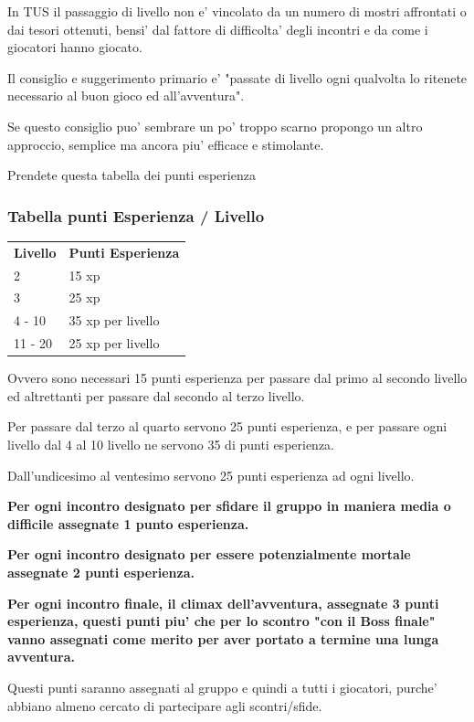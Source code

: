 \documentclass[a4paper,11pt,twoside,openany]{book}
\begin{document}
{In TUS il passaggio di livello non e' vincolato da un numero di mostri affrontati o dai tesori ottenuti, bensi' dal fattore di difficolta' degli incontri e da come i giocatori hanno giocato.

Il consiglio e suggerimento primario e' "passate di livello ogni qualvolta lo ritenete necessario al buon gioco ed all'avventura".

Se questo consiglio puo' sembrare un po' troppo scarno propongo un altro approccio, semplice ma ancora piu' efficace e stimolante.

Prendete questa tabella dei punti esperienza

\subsubsection{Tabella punti Esperienza / Livello}

\label{tabella-punti-esperienza-livello}

\begin{tabular}{ll}
\toprule
\textbf{Livello} & \textbf{Punti Esperienza}\tabularnewline
2 & 15 xp\tabularnewline
3 & 25 xp\tabularnewline
4 - 10 & 35 xp per livello\tabularnewline
11 - 20 & 25 xp per livello\tabularnewline
\end{tabular}

\bigskip

Ovvero sono necessari 15 punti esperienza per passare dal primo al secondo livello ed altrettanti per passare dal secondo al terzo livello.

Per passare dal terzo al quarto servono 25 punti esperienza, e per passare ogni livello dal 4 al 10 livello ne servono 35 di punti esperienza.

Dall'undicesimo al ventesimo servono 25 punti esperienza ad ogni livello.

\textbf{Per ogni incontro designato per sfidare il gruppo in maniera media o difficile assegnate 1 punto esperienza.}

\textbf{Per ogni incontro designato per essere potenzialmente mortale assegnate 2 punti esperienza.}

\textbf{Per ogni incontro finale, il climax dell'avventura, assegnate 3 punti esperienza, questi punti piu' che per lo scontro "con il Boss finale" vanno assegnati come merito per aver portato a termine una lunga avventura.}

Questi punti saranno assegnati al gruppo e quindi a tutti i giocatori, purche' abbiano almeno cercato di partecipare agli scontri/sfide.

}
\end{document}
